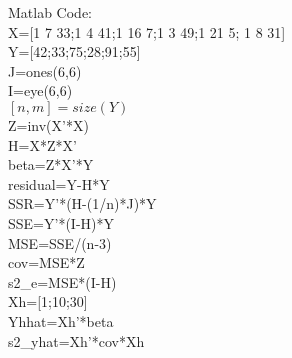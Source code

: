 \documentclass[12pt]{article}
\begin{document}
{Matlab Code:\\
X=[1 7 33;1 4 41;1 16 7;1 3 49;1 21 5; 1 8 31]\\
Y=[42;33;75;28;91;55]\\
J=ones(6,6)\\
I=eye(6,6)\\
$[n,m]=size(Y)$\\
Z=inv(X'*X)\\
H=X*Z*X'\\
beta=Z*X'*Y\\
residual=Y-H*Y\\
SSR=Y'*(H-(1/n)*J)*Y\\
SSE=Y'*(I-H)*Y\\
MSE=SSE/(n-3)\\
cov=MSE*Z\\
s2\_e=MSE*(I-H)\\
Xh=[1;10;30]\\
Yhhat=Xh'*beta\\
s2\_yhat=Xh'*cov*Xh\\

}
\end{document}
